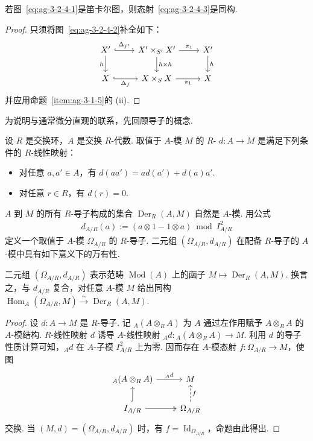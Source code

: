 \begin{proposition}\label{item:ag-3-2-5}
若图~\eqref{eq:ag-3-2-4-1}是笛卡尔图，则态射~\eqref{eq:ag-3-2-4-3}是同构.
\end{proposition}
\begin{proof}
只须将图~\eqref{eq:ag-3-2-4-2}补全如下：
\begin{align*}
\begin{tikzcd}[ampersand replacement=\&]
X'\arrow[r,hook,"\Delta_{f'}"]\arrow[d,"h"'] \& X'\times_{S'}X'\arrow[r,"\pi_1"]\arrow[d,"h\times h"] \& X'\arrow[d,"h"]\\
X\arrow[r,hook,"\Delta_f"'] \& X\times_SX\arrow[r,"\pi_1"'] \& X
\end{tikzcd}
\end{align*}
并应用命题~\ref{item:ag-3-1-5}的 (ii).
\end{proof}
为说明与通常微分直观的联系，先回顾导子的概念.
\begin{definition}\label{item:ag-3-2-6}
设 $R$ 是交换环，$A$ 是交换 $R$-代数. 取值于 $A$-模 $M$ 的 $R$- $d:A\longrightarrow M$ 是满足下列条件的 $R$-线性映射：
\begin{itemize}
\item 对任意 $a,a'\in A$，有 $d(aa')=ad(a')+d(a)a'$.
\item 对任意 $r\in R$，有 $d(r)=0$.
\end{itemize}
\end{definition}
$A$ 到 $M$ 的所有 $R$-导子构成的集合 $\operatorname{Der}_R(A,M)$ 自然是 $A$-模. 用公式
\begin{align*}
d_{A/R}(a):=(a\otimes1-1\otimes a)\bmod I_{A/R}^2
\end{align*}
定义一个取值于 $A$-模 $\Omega_{A/R}$ 的 $R$-导子.
二元组 $(\Omega_{A/R},d_{A/R})$ 在配备 $R$-导子的 $A$-模中具有如下意义下的万有性.
\begin{proposition}\label{item:ag-3-2-7}
二元组 $(\Omega_{A/R},d_{A/R})$ 表示范畴 $\operatorname{Mod}(A)$ 上的函子 $M\mapsto\operatorname{Der}_R(A,M)$. 换言之，与 $d_{A/R}$ 复合，对任意 $A$-模 $M$ 给出同构 $\operatorname{Hom}_A(\Omega_{A/R},M)\xrightarrow\sim\operatorname{Der}_R(A,M)$.
\end{proposition}
\begin{proof}
设 $d:A\longrightarrow M$ 是 $R$-导子. 记 ${}_A(A\otimes_RA)$ 为 $A$ 通过左作用赋予 $A\otimes_RA$ 的 $A$-模结构. $R$-线性映射 $d$ 诱导 $A$-线性映射 ${}_Ad:{}_A(A\otimes_RA)\longrightarrow M$. 利用 $d$ 的导子性质计算可知，${}_Ad$ 在 $A$-子模 $I_{A/R}^2$ 上为零. 因而存在 $A$-模态射 $f:\Omega_{A/R}\longrightarrow M$，使图
\begin{align*}
\begin{tikzcd}[ampersand replacement=\&]
{}_A(A\otimes_RA)\arrow[r,"{}_Ad"] \& M\\
I_{A/R}\arrow[u,hook]\arrow[r,two heads] \& \Omega_{A/R}\arrow[u,dashed,"f"']
\end{tikzcd}
\end{align*}
交换. 当 $(M,d)=(\Omega_{A/R},d_{A/R})$ 时，有 $f=\operatorname{Id}_{\Omega_{A/R}}$，命题由此得出.
\end{proof}
